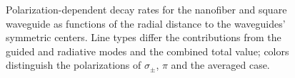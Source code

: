 \documentclass[preprint,aps,pra,onecolumn,superscriptaddress]{revtex4-1} %
\begin{document}
\begin{appendix}
\begin{figure}[htb]
\centering
 \begin{minipage}[h]{0.4\linewidth}
   \end{minipage}\vfill
   \begin{minipage}[h]{0.4\linewidth}
   \end{minipage}
\caption{Polarization-dependent decay rates for the nanofiber \protect{} and square waveguide \protect{} as functions of the radial distance to the waveguides' symmetric centers. Line types differ the contributions from the guided and radiative modes and the combined total value; colors distinguish the polarizations of $ \sigma_\pm $, $ \pi $ and the averaged case. }\label{fig:decayrates}
\end{figure}


\end{appendix}
\end{document}
